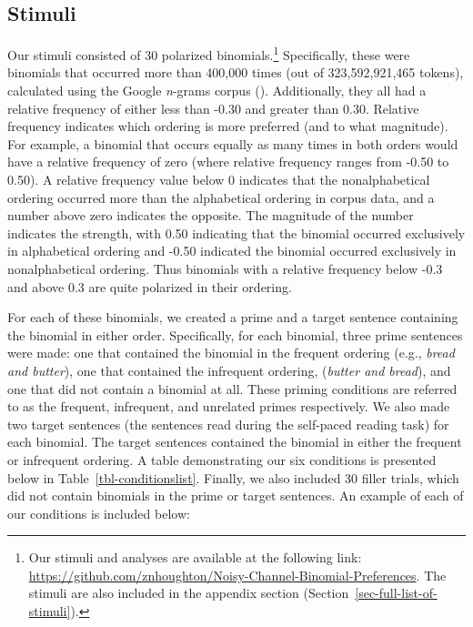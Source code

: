 \documentclass[
  12pt,
]{scrartcl}
\begin{document}
\subsection{Stimuli}\label{stimuli}

Our stimuli consisted of 30 polarized binomials.\footnote{Our stimuli
  and analyses are available at the following link:
  \url{https://github.com/znhoughton/Noisy-Channel-Binomial-Preferences}.
  The stimuli are also included in the appendix section
  (Section~\ref{sec-full-list-of-stimuli}).} Specifically, these were
binomials that occurred more than 400,000 times (out of 323,592,921,465
tokens), calculated using the Google \emph{n}-grams corpus
(). Additionally, they all had a relative frequency of either less
than -0.30 and greater than 0.30. Relative frequency indicates which
ordering is more preferred (and to what magnitude). For example, a
binomial that occurs equally as many times in both orders would have a
relative frequency of zero (where relative frequency ranges from -0.50
to 0.50). A relative frequency value below 0 indicates that the
nonalphabetical ordering occurred more than the alphabetical ordering in
corpus data, and a number above zero indicates the opposite. The
magnitude of the number indicates the strength, with 0.50 indicating
that the binomial occurred exclusively in alphabetical ordering and
-0.50 indicated the binomial occurred exclusively in nonalphabetical
ordering. Thus binomials with a relative frequency below -0.3 and above
0.3 are quite polarized in their ordering.

For each of these binomials, we created a prime and a target sentence
containing the binomial in either order. Specifically, for each
binomial, three prime sentences were made: one that contained the
binomial in the frequent ordering (e.g., \emph{bread and butter}), one
that contained the infrequent ordering, (\emph{butter and bread}), and
one that did not contain a binomial at all. These priming conditions are
referred to as the frequent, infrequent, and unrelated primes
respectively. We also made two target sentences (the sentences read
during the self-paced reading task) for each binomial. The target
sentences contained the binomial in either the frequent or infrequent
ordering. A table demonstrating our six conditions is presented below in
Table~\ref{tbl-conditionslist}. Finally, we also included 30 filler
trials, which did not contain binomials in the prime or target
sentences. An example of each of our conditions is included below:
\end{document}
